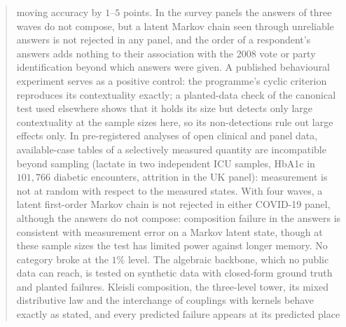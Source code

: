 \documentclass[11pt]{article}
\theoremstyle{definition}
\theoremstyle{remark}
\begin{document}
\begin{abstract}
moving accuracy by $1$--$5$ points. In the survey panels the answers of three waves do not compose, but a latent Markov chain seen
through unreliable answers is not rejected in any panel, and the order of a respondent's answers adds nothing to their association with the 2008
vote or party identification beyond which answers were given. A published behavioural experiment serves as a positive control: the
programme's cyclic criterion reproduces its contextuality exactly; a planted-data check of the canonical test used elsewhere shows that it
holds its size but detects only large contextuality at the sample sizes here, so its non-detections rule out large effects only. In
pre-registered analyses of open clinical and panel data, available-case tables of a selectively measured quantity are incompatible beyond
sampling (lactate in two independent ICU samples, HbA1c in $101{,}766$ diabetic encounters, attrition in the UK panel): measurement is not
at random with respect to the measured states. With four waves, a latent first-order Markov chain is not rejected in either COVID-19
panel, although the answers do not compose: composition failure in the answers is consistent with measurement error on a Markov latent
state, though at these sample sizes the test has limited power against longer memory. No category broke at the $1\%$ level. The algebraic backbone, which no public data can reach, is tested on
synthetic data with closed-form ground truth and planted failures. Kleisli composition, the three-level tower, its mixed distributive
law and the interchange of couplings with kernels behave exactly as stated, and every predicted failure appears at its predicted place

\end{abstract}
\end{document}
